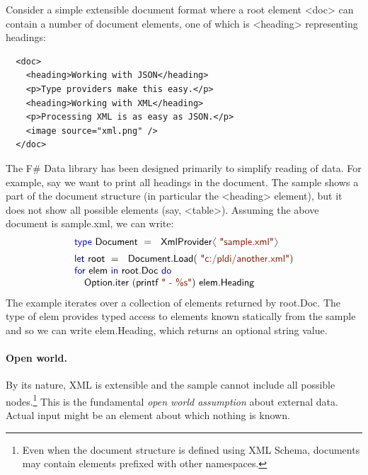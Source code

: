\documentclass[10pt]{sigplanconf}
\newcommand{\langl}{\begin{picture}(4.5,7)
\put(1.1,2.5){\rotatebox{60}{\line(1,0){5.5}}}
\put(1.1,2.5){\rotatebox{300}{\line(1,0){5.5}}}
\end{picture}}
\newcommand{\rangl}{\begin{picture}(4.5,7)
\put(.9,2.5){\rotatebox{120}{\line(1,0){5.5}}}
\put(.9,2.5){\rotatebox{240}{\line(1,0){5.5}}}
\end{picture}}
\newcommand{\kvd}[1]{\textnormal{\textcolor{kvdclr}{\sffamily #1}}}
\newcommand{\str}[1]{\textnormal{\textcolor{strclr}{\sffamily "#1"}}}
\newcommand{\strf}[1]{\textnormal{\textcolor{strclr}{\sffamily #1}}}
\newcommand{\ident}[1]{\textnormal{\sffamily #1}}
\begin{document}
Consider a simple extensible document format where a root element {\ttfamily\small <doc>} can 
contain a number of document elements, one of which is {\ttfamily\small <heading>} representing 
headings:
%
{\small{
\begin{verbatim}
  <doc>
    <heading>Working with JSON</heading>
    <p>Type providers make this easy.</p>
    <heading>Working with XML</heading>
    <p>Processing XML is as easy as JSON.</p>
    <image source="xml.png" />
  </doc>
\end{verbatim}
}}
%
\noindent
The F\# Data library has been designed primarily to simplify reading of data. For example,
say we want to print all headings in the document. The sample shows a part of the document structure 
(in particular the {\ttfamily\small <heading>} element), but it does not show all possible elements 
(say, {\ttfamily\small <table>}). Assuming the above document is \strf{sample.xml}, we can write:
%
\noindent
\begin{equation*}
\begin{array}{l}
 \kvd{type}~\ident{Document}~=~\ident{XmlProvider}\langl\str{sample.xml}\rangl\hspace{1em} \\[0.5em]
 \kvd{let}~\ident{root}~=~\ident{Document.Load}(\str{c:/pldi/another.xml})\\
 \kvd{for}~\ident{elem}~\kvd{in}~\ident{root.Doc}~\kvd{do}\\
 \quad\ident{Option.iter}~(\ident{printf}~\str{ - \%s})~\ident{elem.Heading}\\
\end{array}
\end{equation*}
%
The example iterates over a collection of elements returned by \ident{root.Doc}. The type of \ident{elem} 
provides typed access to elements known statically from the sample and so we can write \ident{elem.Heading}, 
which returns an optional string value.

\paragraph{Open world.}
By its nature, XML is extensible and the sample cannot include all possible nodes.\footnote{Even 
when the document structure is defined using XML Schema, documents may contain elements prefixed 
with other namespaces.} This is the fundamental \emph{open world assumption} about external data. 
Actual input might be an element about which nothing is known.
\end{document}
